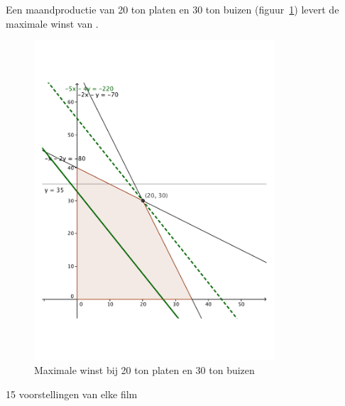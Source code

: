 \begin{Oplossing}{4.9}
     Een maandproductie van 20 ton platen en 30 ton buizen (figuur~\ref{fig:platenbuizen}) levert de maximale winst van .
                 \begin{figure}[hbtp]
\centering
\includegraphics[width=0.8\textwidth]{oefeningen/FigurenLP/OefPlatenBuizen.pdf}
\caption{Maximale winst bij 20 ton platen en 30 ton buizen}
\label{fig:platenbuizen}
\end{figure}
\clearpage
     
\end{Oplossing}
\begin{Oplossing}{4.10}
     15 voorstellingen van elke film
     
\end{Oplossing}
